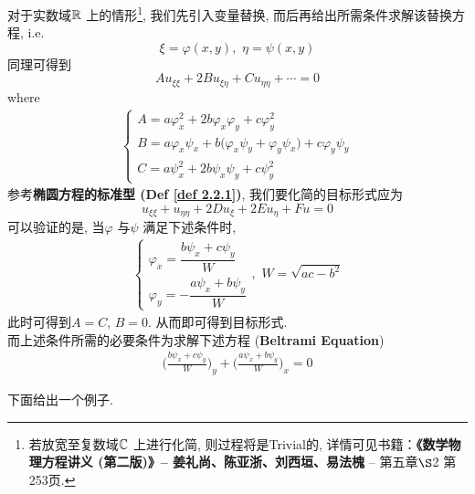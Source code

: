 \begin{enumerate}
		对于实数域$\mathbb{R}$ 上的情形\footnote{若放宽至复数域$\mathbb{C}$ 上进行化简, 则过程将是Trivial的, 详情可见书籍：\textbf{《数学物理方程讲义 (第二版)》--  姜礼尚、陈亚浙、刘西垣、易法槐} -- 第五章$\S$2 第253页.}, 我们先引入变量替换, 而后再给出所需条件求解该替换方程, i.e.
		\[ \xi = \varphi(x , y) , \,\, \eta = \psi(x , y) \]
		同理可得到
		\[ Au_{\xi\xi} + 2Bu_{\xi\eta} + Cu_{\eta\eta} + \cdots = 0 \]
		where 
		\begin{align*}
			\begin{cases}
				A = a \varphi_{x}^2 + 2b \varphi_x \varphi_y + c\varphi_{y}^2 \\
				B = a \varphi_x \psi_x + b \Big( \varphi_x \psi_y + \varphi_y \psi_x \Big) + c \varphi_y \psi_y \\
				C = a \psi_{x}^2 + 2b \psi_x \psi_y + c\psi_{y}^2
			\end{cases}
		\end{align*}
		参考\textbf{椭圆方程的标准型 (Def \ref{def 2.2.1})}, 我们要化简的目标形式应为
		\[ u_{\xi\xi} + u_{\eta\eta} + 2Du_{\xi} + 2Eu_{\eta} + Fu = 0 \]
		可以验证的是, 当$\varphi$ 与$\psi$ 满足下述条件时, 
		\begin{align*}
			\begin{cases}
				\varphi_x = \dfrac{b\psi_x + c\psi_y}{W} \\
				\varphi_y = - \dfrac{a\psi_x + b\psi_y}{W}
			\end{cases} , \,\, W = \sqrt{ac - b^2}
		\end{align*}
		此时可得到$A = C$, $B = 0$. 从而即可得到目标形式. \\
		而上述条件所需的必要条件为求解下述方程 (\textbf{Beltrami Equation})
		\begin{align*}
			\Big( \frac{b \psi_x + c\psi_y}{W} \Big)_y + \Big( \frac{a\psi_x + b\psi_y}{W} \Big)_x = 0
		\end{align*}
	\end{enumerate}
	
	\newpage
	
	下面给出一个例子. 
	
